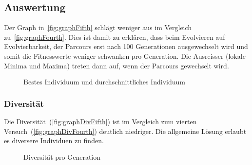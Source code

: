     \subsection{Auswertung\label{sub:fifthAuswertung}}

      Der Graph in~\vref{fig:graphFifth} schlägt weniger aus im Vergleich zu~\vref{fig:graphFourth}.
      Dies ist damit zu erklären, dass beim Evolvieren auf Evolvierbarkeit,
      der Parcours erst nach 100 Generationen ausgewechselt wird und
      somit die Fitnesswerte weniger schwanken pro Generation.
      Die Ausreisser (lokale Minima und Maxima) treten dann auf, wenn der Parcours gewechselt wird.

      \begin{figure}[H]
        \centering
        
        \caption{Bestes Individuum und durchschnittliches Individuum\label{fig:graphFifth}}
      \end{figure}

      \subsubsection{Diversität}

        Die Diversität~(\vref{fig:graphDivFifth}) ist im Vergleich zum vierten Versuch~(\vref{fig:graphDivFourth}) deutlich niedriger.
        Die allgemeine Lösung erlaubt es diversere Individuen zu finden.

        \begin{figure}[H]
          \centering
          
          \caption{Diversität pro Generation\label{fig:graphDivFifth}}
        \end{figure}
